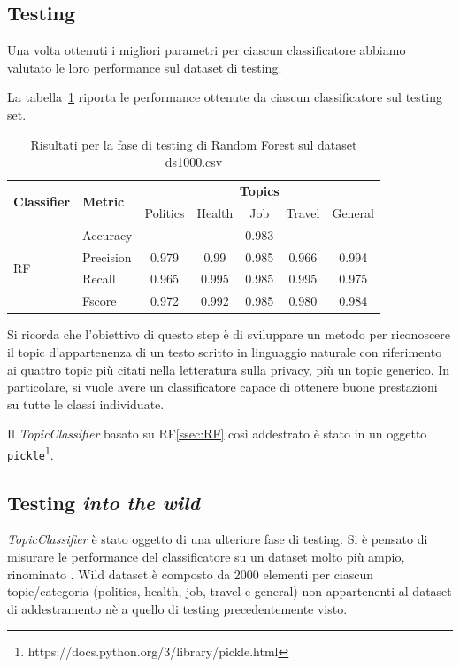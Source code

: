 \subsection{Testing}
\label{ssec:testing_Topic}
Una volta ottenuti i migliori parametri per ciascun classificatore abbiamo valutato le loro performance sul dataset di testing.

La tabella~\ref{tbl:training_ds1000} riporta le performance ottenute da ciascun classificatore sul testing set.
\begin{table}[h]
\begin{tabular}{|l|l|c|c|c|c|c|}
\hline
\multirow{2}{*}{\textbf{Classifier}} & \multirow{2}{*}{\textbf{Metric}} & \multicolumn{5}{c|}{\textbf{Topics}} \\ \cline{3-7} 
 &  & Politics & Health & Job & Travel & General \\ \hline
\multirow{4}{*}{RF} & Accuracy & \multicolumn{5}{c|}{0.983} \\ \cline{2-7} 
 & Precision & 0.979 & 0.99 & 0.985 & 0.966 & 0.994 \\ \cline{2-7} 
 & Recall & 0.965 & 0.995 & 0.985  & 0.995 & 0.975 \\ \cline{2-7} 
 & Fscore & 0.972 & 0.992 & 0.985 & 0.980 & 0.984 \\ \hline
\end{tabular}
\caption{Risultati per la fase di testing di Random Forest sul dataset ds1000.csv}
\label{tbl:training_ds1000}
\end{table}
\FloatBarrier
Si ricorda che l'obiettivo di questo step è di sviluppare un metodo per riconoscere il topic d'appartenenza di un testo scritto in linguaggio naturale con riferimento ai quattro topic più citati nella letteratura sulla privacy\cite{looseTweets,dontTweetThis}, più un topic generico. In particolare, si vuole avere un classificatore capace di ottenere buone prestazioni su tutte le classi individuate. 

Il \textit{TopicClassifier} basato su RF\ref{ssec:RF} così addestrato è stato  in un oggetto {\tt pickle}\footnote{https://docs.python.org/3/library/pickle.html}.

\subsection{Testing \textit{into the wild}}
\label{ssec:testing_wild}
\textit{TopicClassifier} è stato oggetto di una ulteriore fase di testing. Si è pensato di misurare le performance del classificatore su un dataset molto più ampio, rinominato . Wild dataset è composto da 2000 elementi per ciascun topic/categoria (politics, health, job, travel e general) non appartenenti al dataset di addestramento nè a quello di testing precedentemente visto.

